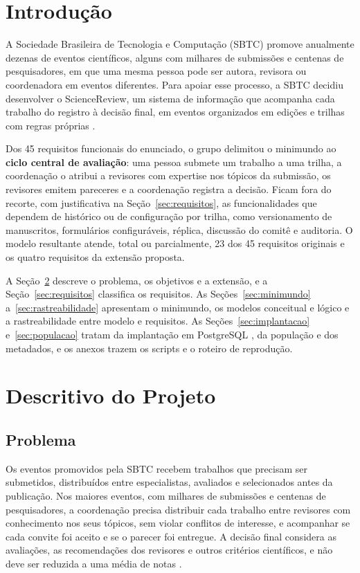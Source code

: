 \documentclass[12pt,a4paper]{article}
\begin{document}
\section{Introdução}
A Sociedade Brasileira de Tecnologia e Computação (SBTC) promove anualmente dezenas de
eventos científicos, alguns com milhares de submissões e centenas de pesquisadores, em
que uma mesma pessoa pode ser autora, revisora ou coordenadora em eventos diferentes.
Para apoiar esse processo, a SBTC decidiu desenvolver o ScienceReview, um sistema de
informação que acompanha cada trabalho do registro à decisão final, em eventos
organizados em edições e trilhas com regras próprias \citep{ufba2026caso}.

Dos 45 requisitos funcionais do enunciado, o grupo delimitou o minimundo ao
\textbf{ciclo central de avaliação}: uma pessoa submete um trabalho a uma trilha, a
coordenação o atribui a revisores com expertise nos tópicos da submissão, os revisores
emitem pareceres e a coordenação registra a decisão. Ficam fora do recorte, com
justificativa na Seção~\ref{sec:requisitos}, as funcionalidades que dependem de
histórico ou de configuração por trilha, como versionamento de manuscritos, formulários
configuráveis, réplica, discussão do comitê e auditoria. O modelo resultante atende,
total ou parcialmente, 23 dos 45 requisitos originais e os quatro requisitos da
extensão proposta.

A Seção~\ref{sec:descritivo} descreve o problema, os objetivos e a extensão, e a
Seção~\ref{sec:requisitos} classifica os requisitos. As Seções~\ref{sec:minimundo}
a~\ref{sec:rastreabilidade} apresentam o minimundo, os modelos conceitual e lógico e a
rastreabilidade entre modelo e requisitos. As Seções~\ref{sec:implantacao}
e~\ref{sec:populacao} tratam da implantação em PostgreSQL \citep{postgresql}, da
população e dos metadados, e os anexos trazem os scripts e o roteiro de reprodução.


\section{Descritivo do Projeto}\label{sec:descritivo}

\subsection{Problema}
Os eventos promovidos pela SBTC recebem trabalhos que precisam ser submetidos,
distribuídos entre especialistas, avaliados e selecionados antes da publicação. Nos
maiores eventos, com milhares de submissões e centenas de pesquisadores, a coordenação
precisa distribuir cada trabalho entre revisores com conhecimento nos seus tópicos, sem
violar conflitos de interesse, e acompanhar se cada convite foi aceito e se o parecer
foi entregue. A decisão final considera as avaliações, as recomendações dos revisores e
outros critérios científicos, e não deve ser reduzida a uma média de notas
\citep{ufba2026caso}.
\end{document}
